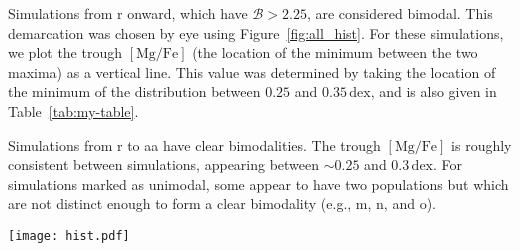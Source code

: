 \documentclass[twocolumn,linenumbers,trackchanges]{aastex631}
\newcommand{\FeH}{\ensuremath{[\textrm{Fe}/\textrm{H}]}}
\newcommand{\MgFe}{\ensuremath{[\textrm{Mg}/\textrm{Fe}]}}
\newcommand{\dex}{\ensuremath{\textrm{dex}}}
\begin{document}
Simulations from r onward, which have $\mathcal{B}>2.25$, are considered bimodal. This demarcation was chosen by eye using Figure~\ref{fig:all_hist}. For these simulations, we plot the trough \MgFe{} (the location of the minimum between the two maxima) as a vertical line. This value was determined by taking the location of the minimum of the distribution between $0.25$ and $0.35\,\dex$, and is also given in Table~\ref{tab:my-table}.

Simulations from r to aa have clear bimodalities. The trough \MgFe{} is roughly consistent between simulations, appearing between $\sim0.25$ and $0.3\,\dex$. For simulations marked as unimodal, some appear to have two populations but which are not distinct enough to form a clear bimodality (e.g., m, n, and o).

\begin{figure*}
  \centering
  \texttt{[image: hist.pdf]}
  \caption{The conditional 1D \MgFe{} distribution for all stars with \FeH{} in a bin of width $0.1\,\dex$ centered at $0\,\dex$. Each panel corresponds to a different set of orbital parameters ($R_0$, $V_0$, and $\eta$) and is labeled alphabetically from least to most bimodal, with the labels defined in Table~\ref{tab:my-table}. The final simulation, which has the highest bimodality score $\mathcal{B}$, is labeled ``aa.'' Simulations with $\mathcal{B}>2.25$ (starting from simulation r) exhibit clear bimodalities, with the trough \MgFe{} (minimum between the two peaks) marked. This trough generally falls between $0.25$ and $0.3\,\dex$. Simulations with lower bimodality scores appear unimodal, though some (e.g., m, n, and o) show hints of a secondary population without forming a distinct bimodal structure.}
  \label{fig:all_hist}
\end{figure*}
\end{document}
